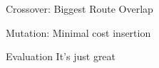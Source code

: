 \documentclass[ %
                    author={Callum Mann},
                     title={Genetic algorithm for the CVRP},
                  subtitle={Capacitated Vehicle Routing Problem},
                      type={Heuristic},
                      year={2016}]{poster}
\begin{document}
\begin{frame}{}
\begin{columns}[t]
\begin{column}{0.422\linewidth}
    \vfill

    \begin{block}{\Large Crossover: Biggest Route Overlap}
      \vspace{10cm}
    \end{block}
    \vspace{1cm}

    \begin{block}{\Large Mutation: Minimal cost insertion}
      \vspace{10cm}
    \end{block}
    \vspace{1cm}

    \begin{block}{\Large Evaluation}
      It's just great
    \end{block}
    \vspace{1cm}
  \end{column}
\end{columns}

\vfill

\end{frame}

\end{document}
